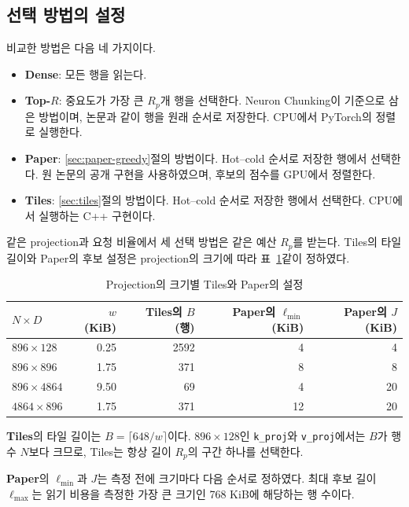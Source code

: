 \subsection{선택 방법의 설정}\label{sec:exp-methods}

비교한 방법은 다음 네 가지이다.

\begin{itemize}
\item \textbf{Dense}: 모든 행을 읽는다.
\item \textbf{Top-$R$}: 중요도가 가장 큰 $R_p$개 행을 선택한다. Neuron Chunking이 기준으로 삼은 방법이며, 논문과 같이 행을 원래 순서로 저장한다. CPU에서 PyTorch의 정렬로 실행한다.
\item \textbf{Paper}: \ref{sec:paper-greedy}절의 방법이다. Hot--cold 순서로 저장한 행에서 선택한다. 원 논문의 공개 구현을 사용하였으며, 후보의 점수를 GPU에서 정렬한다.
\item \textbf{Tiles}: \ref{sec:tiles}절의 방법이다. Hot--cold 순서로 저장한 행에서 선택한다. CPU에서 실행하는 C++ 구현이다.
\end{itemize}

같은 projection과 요청 비율에서 세 선택 방법은 같은 예산 $R_p$를 받는다. Tiles의 타일 길이와 Paper의 후보 설정은 projection의 크기에 따라 표~\ref{tab:selector-settings}\와 같이 정하였다.

\begin{table}[htbp]
    \centering
    \caption{Projection의 크기별 Tiles와 Paper의 설정}
    \label{tab:selector-settings}
    \begin{tabular}{lrrrr}
        \toprule
        $N\times D$ & $w$ (KiB) & Tiles의 $B$ (행) & Paper의 $\ell_{\min}$ (KiB) & Paper의 $J$ (KiB) \\
        \midrule
        $896\times128$ & 0.25 & 2592 & 4 & 4 \\
        $896\times896$ & 1.75 & 371 & 8 & 8 \\
        $896\times4864$ & 9.50 & 69 & 4 & 20 \\
        $4864\times896$ & 1.75 & 371 & 12 & 20 \\
        \bottomrule
    \end{tabular}
\end{table}

\textbf{Tiles}의 타일 길이는 $B=\lceil648/w\rceil$이다. $896\times128$인 \texttt{k\_proj}와 \texttt{v\_proj}에서는 $B$가 행 수 $N$보다 크므로, Tiles는 항상 길이 $R_p$의 구간 하나를 선택한다.

\textbf{Paper}의 $\ell_{\min}$과 $J$는 측정 전에 크기마다 다음 순서로 정하였다. 최대 후보 길이 $\ell_{\max}$는 읽기 비용을 측정한 가장 큰 크기인 768 KiB에 해당하는 행 수이다.

